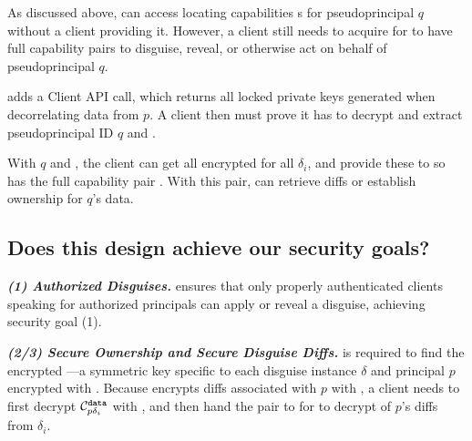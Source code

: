 
As discussed above, \sys can access locating capabilities s for pseudoprincipal $q$ without a
client providing it. 
%
However, a client still needs to acquire  for \sys to have full capability pairs
to disguise, reveal, or otherwise act on behalf of pseudoprincipal $q$.

\sys adds a  Client API call, which returns all locked private
keys  generated when decorrelating data from $p$.
A client then must prove it has  to decrypt  and extract pseudoprincipal ID $q$ and .

With $q$ and , the client can get all encrypted  for all $\delta_i$, and
provide these to \sys so \sys has the full capability pair . With
this pair, \sys can retrieve diffs or establish ownership for $q$'s data.


\subsection{Does this design achieve our security goals?}
\label{sec:achievegoals}
\vspace{6pt}\noindent\textbf{\emph{(1) Authorized Disguises.}}
\sys ensures that only properly authenticated clients speaking for authorized principals can apply or
reveal a disguise, achieving security goal (1).

\vspace{6pt}\noindent\textbf{\emph{(2/3) Secure Ownership and Secure Disguise Diffs.}}
 is required to find the encrypted ---a symmetric key
specific to each disguise instance $\delta$ and principal $p$ encrypted with .
Because \sys encrypts  diffs associated with $p$ with , a client
needs to first decrypt $\mathcal{C}^{\texttt{data}}_{p\delta_i}$ with , and then hand the pair 
to \sys for \sys to decrypt of $p$'s diffs from $\delta_i$.

